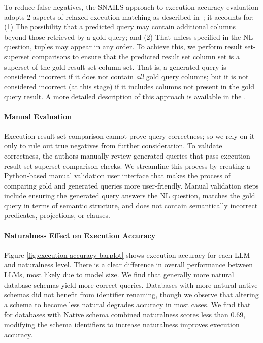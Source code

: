 To reduce false negatives, the SNAILS approach to execution accuracy evaluation adopts 2 aspects of relaxed execution matching as described in~\cite{floratou2024nl2sql}; it accounts for: (1) The possibility that a predicted query may contain additional columns beyond those retrieved by a gold query; and (2) That unless specified in the NL question, tuples may appear in any order.
To achieve this, we perform result set-superset comparisons to ensure that the predicted result set column set is a superset of the gold result set column set.
That is, a generated query is considered incorrect if it does not contain \emph{all} gold query columns; but it is not considered incorrect (at this stage) if it includes columns not present in the gold query result. 
A more detailed description of this approach is available in the \fi.

\paragraph{\textbf{Manual Evaluation}}
Execution result set comparison cannot prove query correctness; so we rely on it only to rule out true negatives from further consideration.
To validate correctness, the authors manually review generated queries that pass execution result set-superset comparison checks.
We streamline this process by creating a Python-based manual validation user interface that makes the process of comparing gold and generated queries more user-friendly.
Manual validation steps include ensuring the generated query answers the NL question, matches the gold query in terms of semantic structure, and does not contain semantically incorrect predicates, projections, or clauses.

\paragraph{\textbf{Naturalness Effect on Execution Accuracy}}

Figure \ref{fig:execution-accuracy-barplot} shows execution accuracy for each LLM and naturalness level.
There is a clear difference in overall performance between LLMs, most likely due to model size.
We find that generally more natural database schemas yield more correct queries.
Databases with more natural native schemas did not benefit from identifier renaming, though we observe that altering a schema to become less natural degrades accuracy in most cases. We find that for databases with Native schema combined naturalness scores less than 0.69, modifying the schema identifiers to increase naturalness improves execution accuracy.

